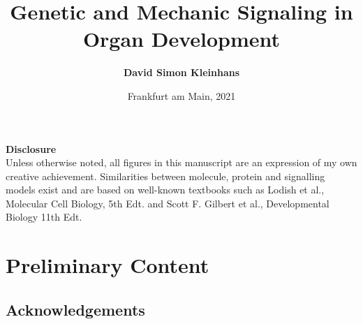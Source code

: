 \documentclass[10pt, b5paper, singlespacinge, twoside]{reedthesis} %
\title{\textbf{Genetic and Mechanic Signaling in Organ Development}}
\author{\textbf{David Simon Kleinhans}}
\date{Frankfurt am Main, 2021}
\theoremstyle{definition}
\theoremstyle{definition}
\theoremstyle{definition}
\theoremstyle{remark}
\begin{document}

  \maketitle

\frontmatter
{} %
\pagestyle{empty} %

  \setcounter{tocdepth}{3}
  \tableofcontents

  \listoftables

  \listoffigures
  \vfill
  \begin{center}
    \textbf{Disclosure}\\
    {Unless otherwise noted, all figures in this manuscript are an expression of my own creative achievement. Similarities between molecule, protein and signalling models exist and are based on well-known textbooks such as Lodish et al., Molecular Cell Biology, 5th Edt. and Scott F. Gilbert et al., Developmental Biology 11th Edt.}
  \end{center}

\mainmatter 

\hypertarget{preliminary-content}{%
\chapter*{Preliminary Content}\label{preliminary-content}}

\hypertarget{acknowledgements}{%
\section*{Acknowledgements}\label{acknowledgements}}

\vspace{.5cm}
\end{document}
